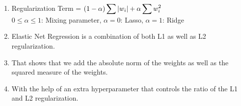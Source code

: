 \begin{enumerate}
    \item Regularization Term = $ (1-\alpha) \displaystyle\sum \left| w_i \right| + \alpha\displaystyle\sum w_i^2$
    \hfill \cite{geeksforgeeks/machine-learning/regularization-in-machine-learning}
    \\
    $0 \leq \alpha \leq 1$: Mixing parameter, $\alpha=0$: Lasso, $\alpha=1$: Ridge

    \item Elastic Net Regression is a combination of both L1 as well as L2 regularization. 
    \hfill \cite{geeksforgeeks/machine-learning/regularization-in-machine-learning}
    
    \item That shows that we add the absolute norm of the weights as well as the squared measure of the weights. 
    \hfill \cite{geeksforgeeks/machine-learning/regularization-in-machine-learning}
    
    \item With the help of an extra hyperparameter that controls the ratio of the L1 and L2 regularization.
    \hfill \cite{geeksforgeeks/machine-learning/regularization-in-machine-learning}
\end{enumerate}
























